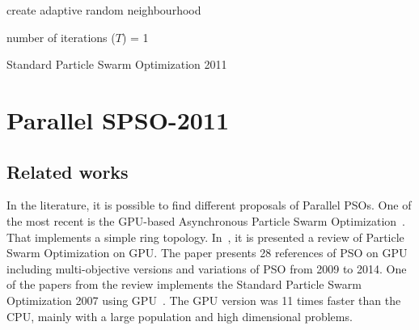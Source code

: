\documentclass[conference]{IEEEtran}
\begin{document}
    \begin{algorithm}[!htb]
        
        create adaptive random neighbourhood\;

        number of iterations ($T$) = 1\;
        
        \caption{Standard Particle Swarm Optimization 2011}
        \label{alg:spso2011}
    \end{algorithm}

    \section{Parallel SPSO-2011}

    \subsection{Related works}

    In the literature, it is possible to find different proposals of Parallel PSOs.
    One of the most recent is the GPU-based Asynchronous Particle Swarm Optimization~\cite{GPUPSO}.
    That implements a simple ring topology.
    In~\cite{ReviewGPUPSO}, it is presented a review of Particle Swarm Optimization on GPU.
    The paper presents 28 references of PSO on GPU including multi-objective versions and variations of PSO from 2009 to 2014.
    One of the papers from the review implements the Standard Particle Swarm Optimization 2007 using GPU~\cite{GPUSPSO2007}. The GPU version was 11 times faster than the CPU, mainly with a large population and high dimensional problems.
\end{document}
